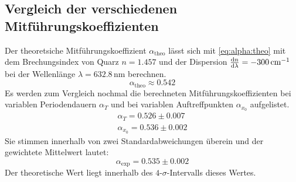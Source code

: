 \subsection{Vergleich der verschiedenen Mitführungskoeffizienten}
Der theoretsiche Mitführungskoeffizient $\alpha_{\text{theo}}$ lässt sich mit \autoref{eq:alpha:theo} mit dem Brechungsindex von Quarz $n=1.457$ 
und der Dispersion $\frac{\mathrm{d} n}{\mathrm{d} \lambda} = -300\,\text{cm}^{-1}$ bei der Wellenlänge $\lambda = 632.8$\,nm berechnen.
\begin{equation}
  \alpha_{\text{theo}} \approx 0.542
\end{equation}
Es werden zum Vergleich nochmal die berechneten Mitführungskoeffizienten bei variablen Periodendauern $\alpha_T$ und bei variablen Auftreffpunkten 
$\alpha_{x_0}$ aufgelistet.
\begin{equation}
\begin{split}
  \alpha_T = 0.526 \pm 0.007 \\
  \alpha_{x_0} = 0.536 \pm 0.002
\end{split}
\end{equation}
Sie stimmen innerhalb von zwei Standardabweichungen überein und der gewichtete Mittelwert lautet:
\begin{equation}
  \alpha_{\text{exp}} = 0.535 \pm 0.002
\end{equation}
Der theoretische Wert liegt innerhalb des $4$-$\sigma$-Intervalls dieses Wertes.